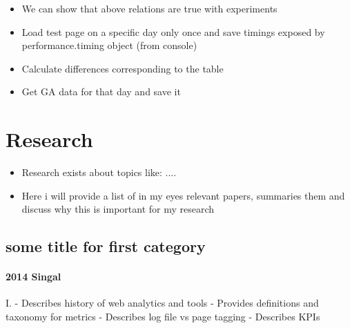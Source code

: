 \begin{itemize}
\item We can show that above relations are true with experiments
\item Load test page on a specific day only once and save timings exposed by performance.timing object (from console)
\item Calculate differences corresponding to the table
\item Get GA data for that day and save it
\end{itemize}
























\section{Research}


\begin{itemize}
\item Research exists about topics like: ....
\item Here i will provide a list of in my eyes relevant papers, summaries them and discuss why this is important for my research
\end{itemize}



\subsection{some title for first category}

\paragraph{2014 Singal}

I.
- Describes history of web analytics and tools
- Provides definitions and taxonomy for metrics
- Describes log file vs page tagging
- Describes KPIs

